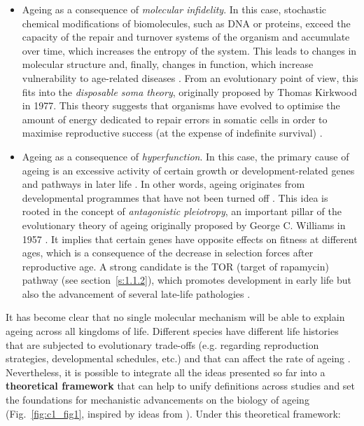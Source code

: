 \begin{itemize}
	
	\item Ageing as a consequence of \textit{molecular infidelity}. In this case, stochastic chemical modifications of biomolecules, such as DNA or proteins, exceed the capacity of the repair and turnover systems of the organism and accumulate over time, which increases the entropy of the system. This leads to changes in molecular structure and, finally, changes in function, which increase vulnerability to age-related diseases \citep{Hayflick2007,Hayflick2007a}. From an evolutionary point of view, this fits into the \textit{disposable soma theory}, originally proposed by Thomas Kirkwood in 1977. This theory suggests that organisms have evolved to optimise the amount of energy dedicated to repair errors in somatic cells in order to maximise reproductive success (at the expense of indefinite survival) \citep{Kirkwood1977,Kirkwood1991}. 
	
	\item Ageing as a consequence of \textit{hyperfunction}. In this case, the primary cause of ageing is an excessive activity of certain growth or development-related genes and pathways in later life \citep{Blagosklonny2006,Blagosklonny2010,DeMagalhaes2012,Gems2015}. In other words, ageing originates from developmental programmes that have not been turned off \citep{Blagosklonny2006}. This idea is rooted in the concept of \textit{antagonistic pleiotropy}, an important pillar of the evolutionary theory of ageing originally proposed by George C. Williams in 1957 \citep{Williams1957}. It implies that certain genes have opposite effects on fitness at different ages, which is a consequence of the decrease in selection forces after reproductive age. A strong candidate is the \acrshort{TOR} (target of rapamycin) pathway (see section~\ref{s:1.1.2}), which promotes development in early life but also the advancement of several late-life pathologies \citep{Blagosklonny2010}. 
	
\end{itemize}

It has become clear that no single molecular mechanism will be able to explain ageing across all kingdoms of life. Different species have different life histories that are subjected to evolutionary trade-offs (e.g. regarding reproduction strategies, developmental schedules, etc.) and that can affect the rate of ageing \citep{Jones2013,Ricklefs2010}. Nevertheless, it is possible to integrate all the ideas presented so far into a \textbf{theoretical framework} that can help to unify definitions across studies and set the foundations for mechanistic advancements on the biology of ageing (Fig.~\ref{fig:c1_fig1}, inspired by ideas from \citep{Hayflick2007,Gems2015,Peto1997,Stroustrup2016,Freund2019}). Under this theoretical framework: 

